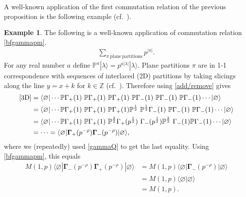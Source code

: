 \documentclass{amsart}
\theoremstyle{definition}
\newtheorem{example}[theorem]{Example}
\newcommand{\ZZ} {\mathbb{Z}}		%
\newcommand{\PP} {\mathbb{P}}
\begin{document}
A well-known application of the first commutation relation of the previous proposition is the following example (cf.~\cite{ORV}).
\begin{example} \label{MacMah}
The following is a well-known application of commutation relation \eqref{bfgammapm}. 
\begin{align} \label{3D}
\sum_{\pi \ \mathrm{plane \ partitions}} p^{|\pi|}.
\end{align}
For any real number $a$ define $\PP^a |\lambda\rangle = p^{a|\lambda|} |\lambda\rangle$. Plane partitions $\pi$ are in 1-1 correspondence with sequences of interlaced (2D) partitions by taking slicings along the line $y=x+k$ for $k \in \ZZ$ (cf.~\cite[Lem.~3.3.2]{You}). Therefore using \eqref{add/remove} gives 
\begin{align*}
\eqref{3D} &=\langle \varnothing | \cdots \PP \Gamma_+(1) \ \PP \Gamma_+(1) \ \PP \Gamma_+(1) \ \PP \Gamma_-(1) \ \PP \Gamma_-(1) \ \PP \Gamma_-(1) \cdots |\varnothing\rangle \\
&= \langle \varnothing | \cdots \PP \Gamma_+(1) \ \PP \Gamma_+(1) \ \PP \Gamma_+(1) \PP^{\frac{1}{2}} \ \PP^{\frac{1}{2}} \Gamma_-(1) \ \PP \Gamma_-(1) \ \PP \Gamma_-(1) \cdots |\varnothing\rangle \\
&= \langle \varnothing | \cdots \PP \Gamma_+(1) \ \PP \Gamma_+(1) \ \PP^{\frac{3}{2}} \Gamma_+(p^{\frac{1}{2}}) \ \Gamma_-(p^{\frac{1}{2}})\PP^{\frac{3}{2}} \ \Gamma_-(1) \PP \Gamma_-(1) \cdots |\varnothing\rangle \\
&= \cdots = \langle \varnothing | \mathbf{\Gamma}_{+}(p^{-\rho}) \mathbf{\Gamma}_{-}(p^{-\rho}) | \varnothing \rangle,
\end{align*}
where we (repeatedly) used \eqref{gammaQ} to get the last equality. Using \eqref{bfgammapm}, this equals
\begin{align*}
M(1,p) \langle \varnothing | \mathbf{\Gamma}_{-}(p^{-\rho}) \mathbf{\Gamma}_{+}(p^{-\rho}) | \varnothing \rangle &= M(1,p) \langle \varnothing | \mathbf{\Gamma}_{-}(p^{-\rho}) | \varnothing \rangle \\ 
&= M(1,p) \langle \varnothing | \varnothing \rangle \\
&= M(1,p).
\end{align*}
\end{example} 
\end{document}
